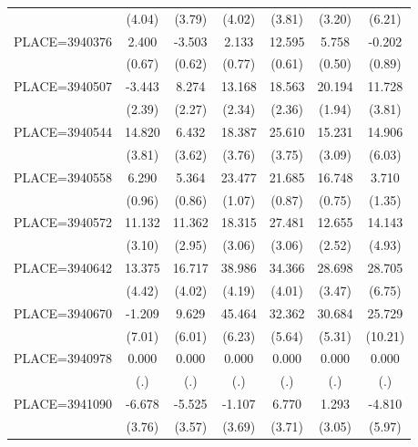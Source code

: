 {\begin{tabular}{l*{6}{c}}
                    &      (4.04)&      (3.79)&      (4.02)&      (3.81)&      (3.20)&      (6.21)\\
PLACE=3940376       &       2.400&      -3.503&       2.133&      12.595&       5.758&      -0.202\\
                    &      (0.67)&      (0.62)&      (0.77)&      (0.61)&      (0.50)&      (0.89)\\
PLACE=3940507       &      -3.443&       8.274&      13.168&      18.563&      20.194&      11.728\\
                    &      (2.39)&      (2.27)&      (2.34)&      (2.36)&      (1.94)&      (3.81)\\
PLACE=3940544       &      14.820&       6.432&      18.387&      25.610&      15.231&      14.906\\
                    &      (3.81)&      (3.62)&      (3.76)&      (3.75)&      (3.09)&      (6.03)\\
PLACE=3940558       &       6.290&       5.364&      23.477&      21.685&      16.748&       3.710\\
                    &      (0.96)&      (0.86)&      (1.07)&      (0.87)&      (0.75)&      (1.35)\\
PLACE=3940572       &      11.132&      11.362&      18.315&      27.481&      12.655&      14.143\\
                    &      (3.10)&      (2.95)&      (3.06)&      (3.06)&      (2.52)&      (4.93)\\
PLACE=3940642       &      13.375&      16.717&      38.986&      34.366&      28.698&      28.705\\
                    &      (4.42)&      (4.02)&      (4.19)&      (4.01)&      (3.47)&      (6.75)\\
PLACE=3940670       &      -1.209&       9.629&      45.464&      32.362&      30.684&      25.729\\
                    &      (7.01)&      (6.01)&      (6.23)&      (5.64)&      (5.31)&     (10.21)\\
PLACE=3940978       &       0.000&       0.000&       0.000&       0.000&       0.000&       0.000\\
                    &         (.)&         (.)&         (.)&         (.)&         (.)&         (.)\\
PLACE=3941090       &      -6.678&      -5.525&      -1.107&       6.770&       1.293&      -4.810\\
                    &      (3.76)&      (3.57)&      (3.69)&      (3.71)&      (3.05)&      (5.97)\\

\end{tabular}}
